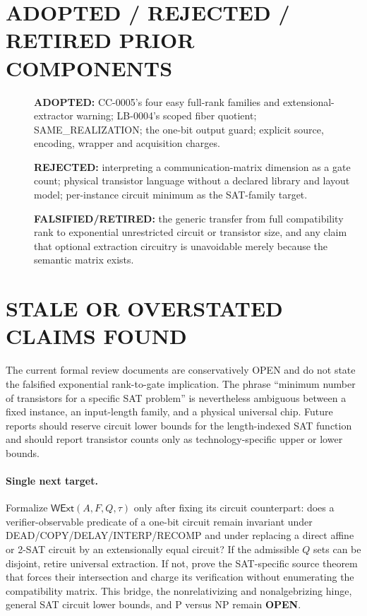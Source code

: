 \documentclass[11pt]{article}
\begin{document}
\section{ADOPTED / REJECTED / RETIRED PRIOR COMPONENTS}
\begin{description}
\item[] \textbf{ADOPTED:} CC-0005's four easy full-rank families and
extensional-extractor warning; LB-0004's scoped fiber quotient; SAME\_REALIZATION;
the one-bit output guard; explicit source, encoding, wrapper and acquisition
charges.
\item[] \textbf{REJECTED:} interpreting a communication-matrix dimension as
a gate count; physical transistor language without a declared library and
layout model; per-instance circuit minimum as the SAT-family target.
\item[] \textbf{FALSIFIED/RETIRED:} the generic transfer from full
compatibility rank to exponential unrestricted circuit or transistor size,
and any claim that optional extraction circuitry is unavoidable merely
because the semantic matrix exists.
\end{description}

\section{STALE OR OVERSTATED CLAIMS FOUND}
The current formal review documents are conservatively OPEN and do not state
the falsified exponential rank-to-gate implication.  The phrase ``minimum
number of transistors for a specific SAT problem'' is nevertheless ambiguous
between a fixed instance, an input-length family, and a physical universal
chip.  Future reports should reserve circuit lower bounds for the
length-indexed SAT function and should report transistor counts only as
technology-specific upper or lower bounds.

\paragraph{Single next target.}
Formalize $\mathsf{WExt}(A,F,Q,\tau)$ only after fixing its circuit
counterpart: does a verifier-observable predicate of a one-bit circuit remain
invariant under DEAD/COPY/DELAY/INTERP/RECOMP and under replacing a direct
affine or 2-SAT circuit by an extensionally equal circuit?  If the admissible
$Q$ sets can be disjoint, retire universal extraction.  If not, prove the
SAT-specific source theorem that forces their intersection and charge its
verification without enumerating the compatibility matrix.  This bridge,
the nonrelativizing and nonalgebrizing hinge, general SAT circuit lower
bounds, and P versus NP remain \textbf{OPEN}.
\end{document}

